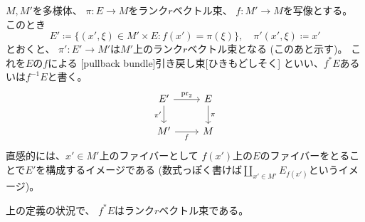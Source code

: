 \documentclass[report]{jlreq}
\begin{document}
\begin{definition}[引き戻し束]
    $M, M'$を多様体、
    $\pi \colon E \to M$をランク$r$ベクトル束、
    $f \colon M' \to M$を{\smooth}写像とする。
    このとき
    \begin{equation}
        E' \coloneqq \{ (x', \xi) \in M' \times E \colon f(x') = \pi(\xi) \},
        \quad
        \pi'(x', \xi) \coloneqq x'
    \end{equation}
    とおくと、
    $\pi' \colon E' \to M'$は$M'$上のランク$r$ベクトル束となる
    (このあと示す)。
    これを$E$の$f$による
    [pullback bundle]{引き戻し束}[ひきもどしそく]
    といい、$f^*E$あるいは$f^{-1}E$と書く。
    \begin{equation}
        \begin{tikzcd}
            E' \ar{d}[swap]{\pi'} \ar{r}{\mathrm{pr}_2} & E \ar{d}{\pi} \\
            M' \ar{r}[swap]{f} & M
        \end{tikzcd}
    \end{equation}
    直感的には、$x' \in M'$上のファイバーとして
    $f(x')$上の$E$のファイバーをとることで$E'$を構成するイメージである
    (数式っぽく書けば$\coprod_{x' \in M'} E_{f(x')}$というイメージ)。
\end{definition}

\begin{proposition}[引き戻し束はベクトル束]
    上の定義の状況で、
    $f^* E$はランク$r$ベクトル束である。
\end{proposition}
\end{document}
